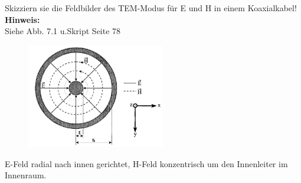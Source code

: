 \begin{question}[section=7,name={Feldbild},difficulty=,quantity=5,type=thr,tags={20061016}]
	Skizziern sie die Feldbilder des TEM-Modus für E und H in einem Koaxialkabel!
	\\ \textbf{Hinweis:}\\
	Siehe Abb. 7.1 u.Skript Seite 78
\end{question}
\begin{solution}
	\begin{figure}[H]
		\includegraphics[width=6cm]{./opn/exm/thr/chp/7/1/bild.jpeg}
	\end{figure}
	E-Feld radial nach innen gerichtet, H-Feld konzentrisch um den Innenleiter im Innenraum.
\end{solution}
